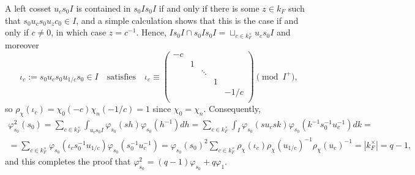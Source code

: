 \documentclass{article}
\theoremstyle{plain}
\theoremstyle{definition}
\begin{document}
    A left cosset $u_cs_0I$ is contained in $s_0Is_0I$ if and only if there is some $z\in k_F$ such that $s_0u_cs_0u_zc_0\in I$, and a simple calculation shows that this is the case if and only if $c\neq 0$, in which case $z=c^{-1}$. Hence, $Is_0I\cap s_0Is_0I=\sqcup_{c\in k_F^\times}u_cs_0I$ and moreover 
    $$\iota_c:=s_0u_cs_0u_{1/c}s_0\in I\quad\text{satisfies}\quad\iota_c\equiv\begin{pmatrix}
        -c &&&& \\
        & 1 &&& \\
        && \ddots && \\
        &&& 1 & \\
        &&&& -1/c \\
    \end{pmatrix}\pmod{I^+},$$
    so $\rho_\chi(\iota_c)=\chi_0(-c)\chi_n(-1/c)=1$ since $\chi_0=\chi_n$. Consequently, 
    \begin{align*}
        \varphi_{s_0}^2(s_0)=\sum_{c\in k_F^\times}\int_{u_cs_0I}\varphi_{s_0}(sh)\varphi_{s_0}(h^{-1})dh=\sum_{c\in k_F^\times}\int_{I}\varphi_{s_0}(su_csk)\varphi_{s_0}(k^{-1}s_0^{-1}u_c^{-1})dk=\\
        =\sum_{c\in k_F^\times}\varphi_{s_0}(\iota_cs_0^{-1}u_{1/c})\varphi_{s_0}(s_0^{-1}u_c^{-1})=\varphi_{s_0}(s_0)^2\sum_{c\in k_F^\times}\rho_\chi(\iota_c)\rho_\chi(u_{1/c})^{-1}\rho_\chi(u_c)^{-1}=|k_F^\times|=q-1,
    \end{align*}
    and this completes the proof that $\varphi_{s_0}^2=(q-1)\varphi_{s_0}+q\varphi_1$.
    
\end{document}
